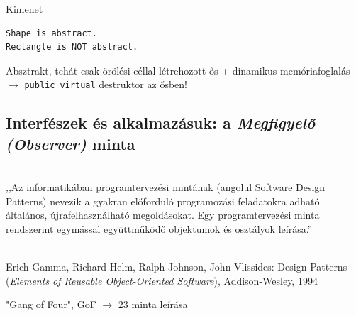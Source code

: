 \begin{frame}[fragile]
    \begin{exampleblock}{}
        \footnotesize
        \vspace{-.3cm}
        
        \vspace{-.3cm}
    \end{exampleblock}
    \begin{block}{Kimenet}
        \footnotesize
        \vspace{-.3cm}
        \begin{verbatim}
Shape is abstract.
Rectangle is NOT abstract.
        \end{verbatim}
        \vspace{-.6cm}
    \end{block}
\end{frame}

\begin{frame}[fragile]
    \begin{exampleblock}{}
        \vspace{-.3cm}
        
        \vspace{-.3cm}
    \end{exampleblock}
    \vfill
    Absztrakt, tehát csak örölési céllal létrehozott ős + dinamikus memóriafoglalás $\to$ \texttt{public virtual} destruktor az ősben!
\end{frame}


\subsection{Interfészek és alkalmazásuk: a \emph{Megfigyelő (Observer)} minta}

\begin{frame}
    \begin{description}[m]
        \item[Tervezési minta (design pattern)] \hfill \\ ,,Az informatikában programtervezési mintának (angolul Software Design Patterns) nevezik a gyakran előforduló programozási feladatokra adható általános, újrafelhasználható megoldásokat. Egy programtervezési minta rendszerint egymással együttműködő objektumok és osztályok leírása.''
        \item[Első jelentős irodalom] \hfill \\ Erich Gamma, Richard Helm, Ralph Johnson, John Vlissides: Design Patterns (\emph{Elements of Reusable Object-Oriented Software}), Addison-Wesley, 1994
        
        \vspace{.3cm}
        "Gang of Four", GoF $\to$ 23 minta leírása
    \end{description}
\end{frame}

